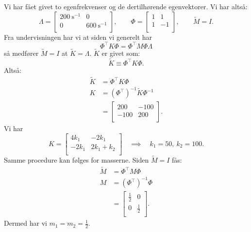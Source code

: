 \begin{derivation}
  Vi har fået givet to egenfrekvenser og de dertilhørende egenvektorer.
  Vi har altså:
  \[ 
  \Lambda = \begin{bmatrix}
  \qty{200}{\s^{-1}}  & 0\\
  0 & \qty{600}{\s^{-1}}\\
  \end{bmatrix}, \qquad \Phi = \begin{bmatrix}
  1 & 1\\
  1 & -1\\
  \end{bmatrix}, \qquad \tilde{M} = I
  .\]
  Fra undervisningen har vi at siden vi generelt har
  \[ 
  \Phi^{\intercal} K \Phi = \Phi^{\intercal} M \Phi \Lambda
  \]
  så medfører $\tilde{M}= I$ at $\tilde{K} = \Lambda$.
  $\tilde{K}$ er givet som:
  \[ 
  \tilde{K} \equiv \Phi^{\intercal} K \Phi
  .\]
  Altså:
  \begin{align*}
    \tilde{K} &= \Phi^{\intercal} K \Phi \\
    K &= \left( \Phi^{\intercal} \right)^{-1} \tilde{K} \Phi^{-1} \\
      &= \begin{bmatrix}
      200 & -100\\
      -100 & 200\\
      \end{bmatrix}
  .\end{align*}
  Vi har
  \[ 
  K = \begin{bmatrix}
  4k_1 & -2k_1\\
  -2k_1 & 2k_1 + k_2\\
  \end{bmatrix} \quad \implies \quad k_1 = 50, \: k_2 = 100
  .\]
  Samme procedure kan følges for masserne.
  Siden $\tilde{M} = I$ fås:
  \begin{align*}
    \tilde{M} &= \Phi^{\intercal} M \Phi \\
    M &= \left( \Phi^{\intercal} \right)^{-1} \Phi \\
      &= \begin{bmatrix}
      \frac{1}{2} & 0\\
      0 & \frac{1}{2}\\
      \end{bmatrix}
  .\end{align*}
  Dermed har vi $m_1 = m_2 = \frac{1}{2}$.


\end{derivation}
